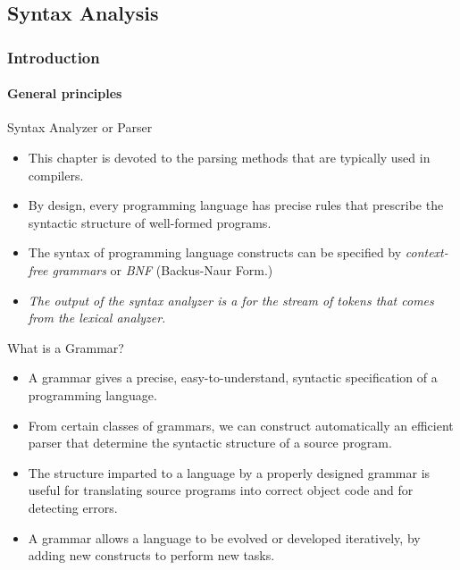 \begin{bibunit}[apalike]

\part[author={Stéphane GALLAND},label={chap:syntax_analysis}]{Syntax Analysis}

\tableofcontentslide

\section{Introduction}

\tableofcontentslide[sectionstyle={show/shaded},subsectionstyle={show/show/hide},subsubsectionstyle={hide/hide/hide/hide}]

\subsection{General principles}

\begin{frame}{Syntax Analyzer or Parser}
	\begin{itemize}
	\item This chapter is devoted to the parsing methods that are typically used in compilers.
	\vfill
	\item By design, every programming language has precise rules that prescribe the syntactic structure of well-formed programs.
	\vfill
	\item The syntax of programming language constructs can be specified by \emph{context-free grammars} or \emph{BNF} (Backus-Naur Form.)
	\vfill
	\item \emph{The output of the syntax analyzer is a  for the stream of tokens that comes from the lexical analyzer.}
	\end{itemize}
\end{frame}

\begin{frame}{What is a Grammar?}
	\begin{itemize}
	\item A grammar gives a precise, easy-to-understand, syntactic specification of a programming language.
	\vfill
	\item From certain classes of grammars, we can construct automatically an efficient parser that determine the syntactic structure of a source program.
	\vfill
	\item The structure imparted to a language by a properly designed grammar is useful for translating source programs into correct object code and for detecting errors.
	\vfill
	\item A grammar allows a language to be evolved or developed iteratively, by adding new constructs to perform new tasks.
	\end{itemize}
\end{frame}


\end{bibunit}
